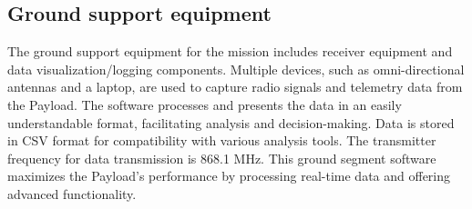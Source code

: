
\subsection{Ground support equipment}
The ground support equipment for the mission includes receiver equipment and data visualization/logging components. Multiple devices, such as omni-directional antennas and a laptop, are used to capture radio signals and telemetry data from the Payload. The software processes and presents the data in an easily understandable format, facilitating analysis and decision-making. Data is stored in CSV format for compatibility with various analysis tools. The transmitter frequency for data transmission is 868.1 MHz. This ground segment software maximizes the Payload's performance by processing real-time data and offering advanced functionality. 
